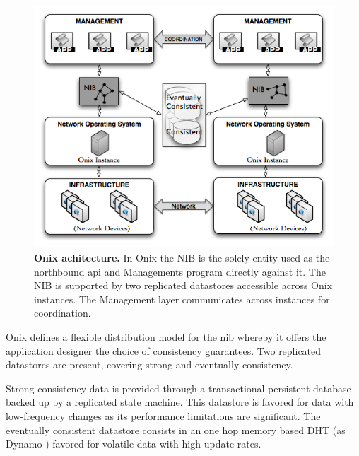 \begin{itemize}
\begin{figure}
  \centering 
  \includegraphics[scale=0.5]{pic/onix-design.png}
  \caption[Onix architecture] {\textbf{Onix achitecture.} In Onix the NIB is the
    solely entity used as the northbound api and Managements program
    directly against it. The NIB is supported by
    two replicated datastores accessible across Onix instances.  The
    Management layer communicates across instances for coordination.}
  \label{fig:onix-design}
\end{figure}


Onix defines a flexible distribution model for the \gls{nib} whereby  it offers the application designer the choice of consistency guarantees. 
Two replicated datastores are present, covering  strong  and
eventually consistency. 

Strong consistency data is provided through a transactional persistent
database backed up by a replicated state machine. 
This datastore is favored for data with low-frequency changes  as its performance limitations are significant. 
The eventually consistent datastore consists in  an one hop memory
based DHT  (as Dynamo  \cite{DeCandia:2007cn}) favored for  volatile
data with high update rates. 


\end{itemize}

